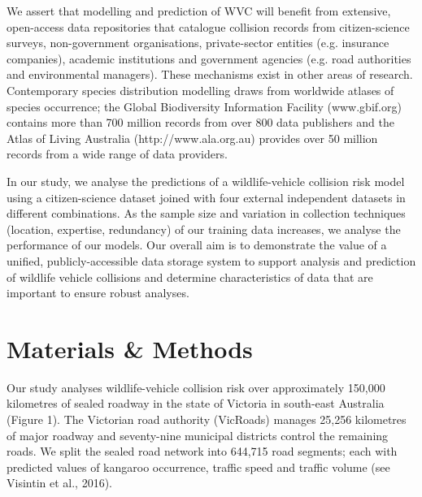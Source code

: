 We assert that modelling and prediction of WVC will benefit from extensive, open-access data repositories that catalogue collision records from citizen-science surveys, non-government organisations, private-sector entities (e.g. insurance companies), academic institutions and government agencies (e.g. road authorities and environmental managers). These mechanisms exist in other areas of research. Contemporary species distribution modelling draws from worldwide atlases of species occurrence; the Global Biodiversity Information Facility (www.gbif.org) contains more than 700 million records from over 800 data publishers and the Atlas of Living Australia (http://www.ala.org.au) provides over 50 million records from a wide range of data providers.

In our study, we analyse the predictions of a wildlife-vehicle collision risk model using a citizen-science dataset joined with four external independent datasets in different combinations. As the sample size and variation in collection techniques (location, expertise, redundancy) of our training data increases, we analyse the performance of our models. Our overall aim is to demonstrate the value of a unified, publicly-accessible data storage system to support analysis and prediction of wildlife vehicle collisions and determine characteristics of data that are important to ensure robust analyses.

\section{Materials \& Methods}

Our study analyses wildlife-vehicle collision risk over approximately 150,000 kilometres of sealed roadway in the state of Victoria in south-east Australia (Figure 1). The Victorian road authority (VicRoads) manages 25,256 kilometres of major roadway and seventy-nine municipal districts control the remaining roads. We split the sealed road network into 644,715 road segments; each with predicted values of kangaroo occurrence, traffic speed and traffic volume (see Visintin et al., 2016).

